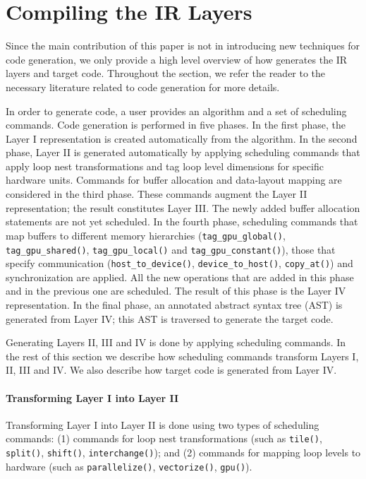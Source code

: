 \vspace{-0.25cm}
\section{Compiling the \framework{} IR Layers}

Since the main contribution of this paper is not in introducing new techniques for code generation, we only provide a high level overview of how \framework{} generates the IR layers and target code.  Throughout the section, we refer the reader to the necessary literature related to code generation for more details.

In order to generate code, a \framework{} user provides an algorithm and a set of scheduling commands.  Code generation is performed in five phases.  In the first phase, the Layer I representation is created automatically from the algorithm.
In the second phase, Layer II is generated automatically by applying scheduling commands that apply loop nest transformations and tag loop level dimensions for specific hardware units. 
Commands for buffer allocation and data-layout mapping are considered in the third phase.  These commands augment the Layer II representation; the result constitutes Layer III.  The newly added buffer allocation statements are not yet scheduled.  In the fourth phase, scheduling commands that map buffers to different memory hierarchies (\texttt{tag\_gpu\_global()}, \texttt{tag\_gpu\_shared()}, \texttt{tag\_gpu\_local()} and \texttt{tag\_gpu\_constant()}), those that specify communication (\texttt{host\_to\_device()}, \texttt{device\_to\_host()}, \texttt{copy\_at()}) and synchronization are applied.  All the new operations that are added in this phase and in the previous one are scheduled.  The result of this phase is the Layer IV representation.  In the final phase, an annotated abstract syntax tree (AST) is generated from Layer IV; this AST is traversed to generate the target code.



Generating Layers II, III and IV is done by applying \framework{} scheduling commands.
In the rest of this section we describe how scheduling commands transform Layers I, II, III and IV.   We also describe how target code is generated from Layer IV.

\vspace{-0.25cm}
\paragraph{Transforming Layer I into Layer II}
Transforming Layer I into Layer II is done using two types of scheduling commands: (1) commands for loop nest transformations (such as \texttt{tile()}, \texttt{split()}, \texttt{shift()}, \texttt{interchange()}); and (2) commands for mapping loop levels to hardware (such as \texttt{parallelize()}, \texttt{vectorize()}, \texttt{gpu()}).

